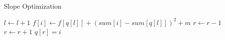\documentclass[11pt]{article}
\begin{document}
\begin{CJK*}{UTF8}{gkai}
    \begin{algorithm}
        \caption{Slope Optimization}
        \begin{algorithmic}[1]
                \State {}
            \EndFunction
            \State
                    \State $l \gets l+1$
                \EndWhile
                \State $f[i] \gets f[q[l]]+(sum[i]-sum[q[l]])^2+m$
                    \State $r \gets r-1$
                \EndWhile
                \State $r\gets r+1$
                \State $q[r]=i$
            \EndFor
            \EndFunction
        \end{algorithmic}
    \end{algorithm}
\end{CJK*}
\end{document}
